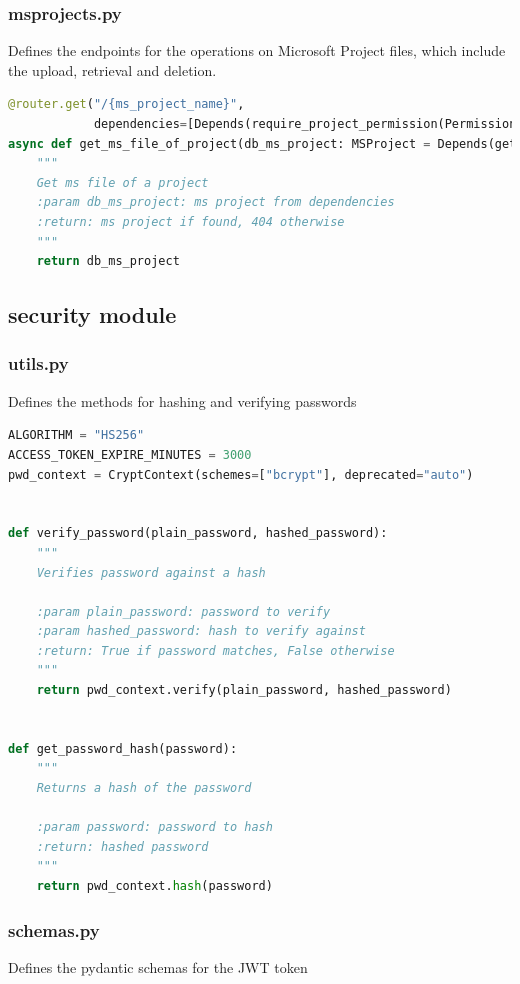 \documentclass[12pt]{report}
\begin{document}
\subsubsection{msprojects.py}
Defines the endpoints for the operations on Microsoft Project files, which include the upload, retrieval and deletion.

\begin{lstlisting}[language=Python, caption=Get microsoft project file]
@router.get("/{ms_project_name}", 
            dependencies=[Depends(require_project_permission(Permissions.view))])
async def get_ms_file_of_project(db_ms_project: MSProject = Depends(get_ms_project)):
    """
    Get ms file of a project
    :param db_ms_project: ms project from dependencies
    :return: ms project if found, 404 otherwise
    """
    return db_ms_project
\end{lstlisting}

\subsection{security module}
\subsubsection{utils.py}
Defines the methods for hashing and verifying passwords

\begin{lstlisting}[language=Python, caption=Password hashing and verifying methods]
ALGORITHM = "HS256"
ACCESS_TOKEN_EXPIRE_MINUTES = 3000
pwd_context = CryptContext(schemes=["bcrypt"], deprecated="auto")


def verify_password(plain_password, hashed_password):
    """
    Verifies password against a hash

    :param plain_password: password to verify
    :param hashed_password: hash to verify against
    :return: True if password matches, False otherwise
    """
    return pwd_context.verify(plain_password, hashed_password)


def get_password_hash(password):
    """
    Returns a hash of the password

    :param password: password to hash
    :return: hashed password
    """
    return pwd_context.hash(password)
\end{lstlisting}

\subsubsection{schemas.py}
Defines the pydantic schemas for the JWT token
\end{document}
